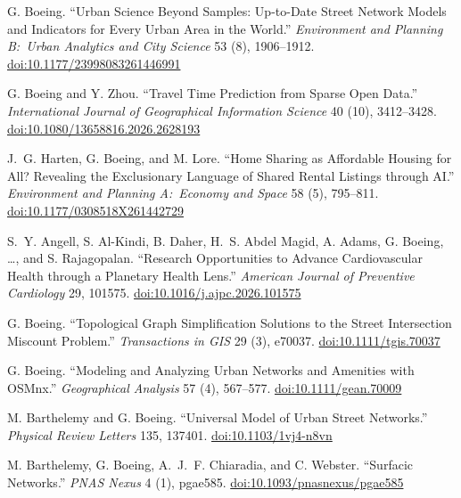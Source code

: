 \documentclass[11pt,letterpaper]{report} %
\begin{document}
\begin{tablist}
\item[2026] \tab{}G. Boeing. \enquote{Urban Science Beyond Samples: Up-to-Date Street Network Models and Indicators for Every Urban Area in the World.} \textit{Environment and Planning B:\ Urban Analytics and City Science} 53 (8), 1906--1912. \href{https://doi.org/10.1177/23998083261446991}{doi:10.1177/23998083261446991}

\item[2026] \tab{}G. Boeing and Y. Zhou. \enquote{Travel Time Prediction from Sparse Open Data.} \textit{International Journal of Geographical Information Science} 40 (10), 3412--3428. \href{https://doi.org/10.1080/13658816.2026.2628193}{doi:10.1080/13658816.2026.2628193}

\item[2026] \tab{}J.~G. Harten, G. Boeing, and M. Lore. \enquote{Home Sharing as Affordable Housing for All? Revealing the Exclusionary Language of Shared Rental Listings through AI.} \textit{Environment and Planning A:\ Economy and Space} 58 (5), 795--811. \href{https://doi.org/10.1177/0308518X261442729}{doi:10.1177/0308518X261442729}

\item[2026] \tab{}S.~Y. Angell, S. Al-Kindi, B. Daher, H.~S. Abdel Magid, A. Adams, G. Boeing, \ldots, and S. Rajagopalan. \enquote{Research Opportunities to Advance Cardiovascular Health through a Planetary Health Lens.} \textit{American Journal of Preventive Cardiology} 29, 101575. \href{https://doi.org/10.1016/j.ajpc.2026.101575}{doi:10.1016/j.ajpc.2026.101575}

\item[2025] \tab{}G. Boeing. \enquote{Topological Graph Simplification Solutions to the Street Intersection Miscount Problem.} \textit{Transactions in GIS} 29 (3), e70037. \href{https://doi.org/10.1111/tgis.70037}{doi:10.1111/tgis.70037}

\item[2025] \tab{}G. Boeing. \enquote{Modeling and Analyzing Urban Networks and Amenities with OSMnx.} \textit{Geographical Analysis} 57 (4), 567--577. \href{https://doi.org/10.1111/gean.70009}{doi:10.1111/gean.70009}

\item[2025] \tab{}M. Barthelemy and G. Boeing. \enquote{Universal Model of Urban Street Networks.} \textit{Physical Review Letters} 135, 137401. \href{https://doi.org/10.1103/1vj4-n8vn}{doi:10.1103/1vj4-n8vn}

\item[2025] \tab{}M. Barthelemy, G. Boeing, A.~J.~F. Chiaradia, and C. Webster. \enquote{Surfacic Networks.} \textit{PNAS Nexus} 4 (1), pgae585. \href{https://doi.org/10.1093/pnasnexus/pgae585}{doi:10.1093/pnasnexus/pgae585}


\end{tablist}
\end{document}
